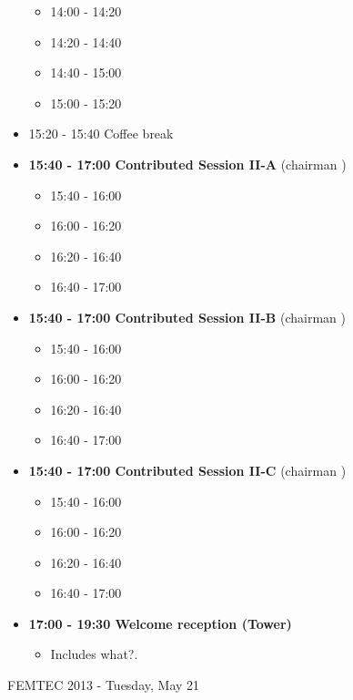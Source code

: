 \documentclass[10pt, A4]{article}%
\begin{document}
\begin{itemize}
\begin{itemize}
    \item 14:00 - 14:20 
    \item 14:20 - 14:40 
    \item 14:40 - 15:00 
    \item 15:00 - 15:20 
  \end{itemize}
  \item 15:20 - 15:40 Coffee break
  \item {\bf 15:40 - 17:00 Contributed Session II-A} (chairman ) 
  \begin{itemize}
    \item 15:40 - 16:00
    \item 16:00 - 16:20 
    \item 16:20 - 16:40 
    \item 16:40 - 17:00 
  \end{itemize}
  \item {\bf 15:40 - 17:00 Contributed Session II-B} (chairman ) 
  \begin{itemize}
    \item 15:40 - 16:00
    \item 16:00 - 16:20 
    \item 16:20 - 16:40 
    \item 16:40 - 17:00 
  \end{itemize}
    \item {\bf 15:40 - 17:00 Contributed Session II-C} (chairman ) 
  \begin{itemize}
    \item 15:40 - 16:00
    \item 16:00 - 16:20 
    \item 16:20 - 16:40 
    \item 16:40 - 17:00 
  \end{itemize}    
  \item {\bf 17:00 - 19:30 Welcome reception (Tower)} 
  \begin{itemize}
     \item Includes what?.
  \end{itemize}
\end{itemize}

\newpage

\centerline{\huge FEMTEC 2013 - Tuesday, May 21}
\vspace{4mm}
\end{document}
